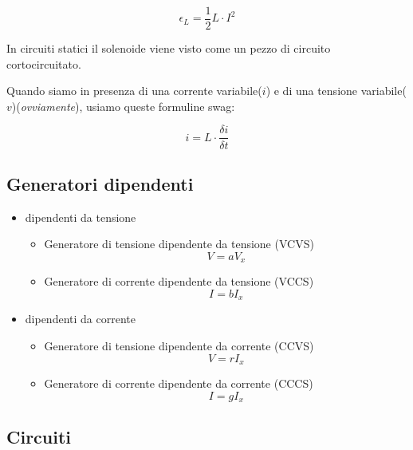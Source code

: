 \begin{equation*}
    \epsilon_L = \frac{1}{2} L\cdot I^2
\end{equation*}

In circuiti statici il solenoide viene visto come un pezzo di circuito cortocircuitato.

Quando siamo in presenza di una corrente variabile($i$) e di una tensione variabile($v$)(\textit{ovviamente}), usiamo queste formuline swag:

\begin{equation*}
    i = L \cdot \frac{\delta i}{\delta t}
\end{equation*}

\subsection{Generatori dipendenti}
\begin{itemize}
    \item dipendenti da tensione
        \begin{itemize}
            \item Generatore di tensione dipendente da tensione (VCVS)
                \begin{equation*}
                    V = aV_x
                \end{equation*}
            \item Generatore di corrente dipendente da tensione (VCCS)
            \begin{equation*}
                I = bI_x
            \end{equation*}
        \end{itemize}
    \item dipendenti da corrente
        \begin{itemize}
            \item Generatore di tensione dipendente da corrente (CCVS)
                \begin{equation*}
                    V = rI_x
                \end{equation*}
            \item Generatore di corrente dipendente da corrente (CCCS)
                \begin{equation*}
                    I = gI_x
                \end{equation*}
        \end{itemize}
\end{itemize}

\subsection{Circuiti}

